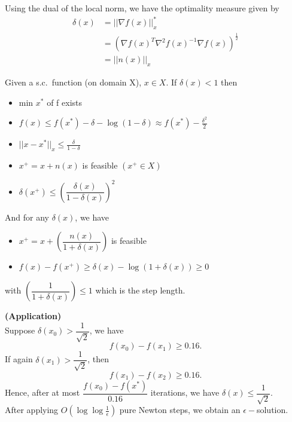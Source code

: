 Using the dual of the local norm, we have the optimality measure given by
\begin{align*}
\delta(x) &= ||\nabla f(x)||^*_x \\
& = (\nabla f(x)^T \nabla^2f(x)^{-1}\nabla f(x))^{\frac{1}{2}} \\
&= ||n(x)||_x
\end{align*}

\begin{property}
Given a s.c.\ function (on domain X), $x\in X$. If $\delta(x) < 1$ then 
\begin{itemize}
\item min $x^*$ of f exists
\item $f(x) \leq f(x^*) - \delta - \log{(1-\delta)} \approx f(x^*) - \frac{\delta^2}{2}$
\item $||x-x^*||_x \leq \frac{\delta}{1 - \delta} $
\item $x^+ = x + n(x)$ is feasible $(x^+ \in X)$
\item $\delta(x^+) \leq \left(\dfrac{\delta(x)}{1-\delta(x)}\right)^2 $\\
\end{itemize}
And for any $\delta(x)$, we have 
\begin{itemize}
\item $x^+ = x + \left(\dfrac{n(x)}{1+\delta(x)}\right) $ is feasible
\item $f(x) - f(x^+) \geq \delta(x) - \log{(1+\delta(x))} \geq 0 $
\end{itemize}
with $\left(\dfrac{1}{1+\delta(x)}\right) \le 1$ which is the step length.
\end{property}

\begin{example}
\begin{leftbar}
\textbf{(Application)}\\ 
Suppose $\delta(x_0) > \dfrac{1}{\sqrt{2}}$, we have $$f(x_0) - f(x_1) \geq 0.16.$$ 
If again $\delta(x_1) > \dfrac{1}{\sqrt{2}}$, then $$f(x_1) - f(x_2) \geq 0.16.$$ Hence, after at most $\dfrac{f(x_0) - f(x^*)}{0.16}$ iterations, we have $\delta(x) \leq \dfrac{1}{\sqrt{2}}$. \\
After applying $O(\log{\log{\frac{1}{\epsilon}}})$ pure Newton steps, we obtain an $\epsilon-$solution.
\end{leftbar}
\end{example}

%
